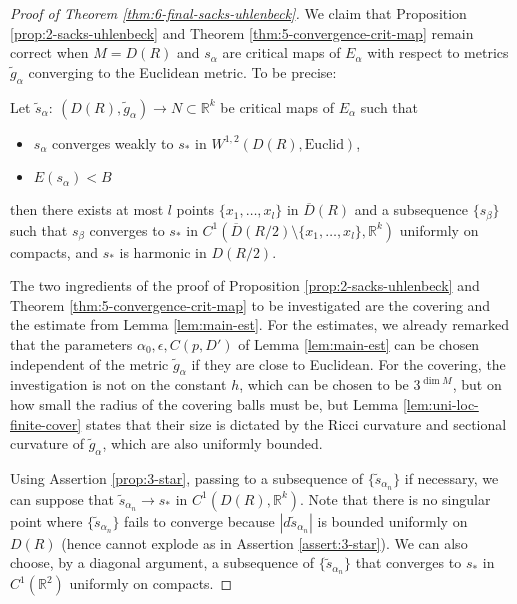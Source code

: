 \begin{proof}[Proof of Theorem \ref{thm:6-final-sacks-uhlenbeck}]
We claim that Proposition \ref{prop:2-sacks-uhlenbeck} and Theorem \ref{thm:5-convergence-crit-map} remain
correct when \(M=D(R)\) and \(s_\alpha\) are critical maps of \(E_\alpha\) with
respect to metrics \(\tilde g_\alpha\) converging to the Euclidean metric. To be
precise:


\begin{assertion}
\label{prop:3-star}
Let \(\tilde s_\alpha:\ (D(R),\tilde g_\alpha) \longrightarrow N\subset \mathbb{R}^k\)
be critical maps of \(E_\alpha\) such that
\begin{itemize}
\item \(s_\alpha\) converges weakly to \(s_*\) in \(W^{1,2}(D(R), \text{Euclid})\),
\item \(E(s_\alpha) < B\)
\end{itemize}
then there exists at most \(l\) points \(\{x_1,\dots,x_l\}\) in \(\overline{D}(R)\)
and a subsequence \(\{s_\beta\}\) such that \(s_\beta\) converges to \(s_*\) in \(C^1(\overline{D}({R/2})\setminus
\{x_1,\dots, x_l\}, \mathbb{R}^k)\) uniformly on compacts, and \(s_*\) is harmonic in
\(D(R/2)\).
\end{assertion}


The two ingredients of the proof of Proposition \ref{prop:2-sacks-uhlenbeck} and
Theorem \ref{thm:5-convergence-crit-map} to be investigated are the covering and the estimate from Lemma
\ref{lem:main-est}. For the estimates, we already remarked that the parameters \(\alpha_0,\epsilon,C(p,D')\) of Lemma \ref{lem:main-est} can be chosen independent of the
metric \(\tilde g_\alpha\) if they are close to Euclidean. For the covering, the investigation is not on the constant
\(h\), which can be chosen to be
\(3^{\dim M}\), but on how small the radius of the covering balls must be, but Lemma
\ref{lem:uni-loc-finite-cover} states that their size is dictated by the Ricci curvature and
sectional curvature of \(\tilde g_\alpha\), which are also uniformly bounded.


Using Assertion \ref{prop:3-star}, passing to a subsequence of \(\{\tilde s_{\alpha_n}\}\)
if necessary, we can suppose that \(\tilde s_{\alpha_n} \to s_*\) in \(C^1(D(R),
\mathbb{R}^k)\). Note that there is no singular point where \(\{\tilde s_{\alpha_n}\}\) fails to converge because \(|d\tilde s_{\alpha_n}|\) is bounded uniformly on \(D(R)\) (hence cannot explode as in Assertion \ref{assert:3-star}). We can also choose, by a
diagonal argument, a
subsequence of \(\{\tilde s_{\alpha_n}\}\) that converges to \(s_*\) in \(C^1(\mathbb{R}^2)\) uniformly on compacts.


\end{proof}
